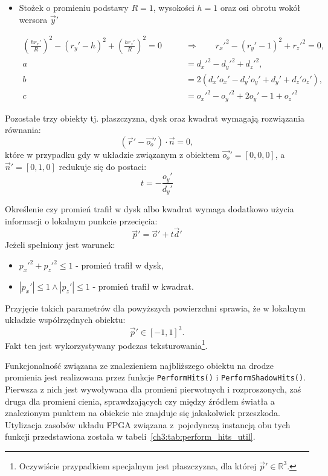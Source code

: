 \begin{enumerate}
\begin{itemize}
\item Stożek o promieniu podstawy $R=1$, wysokości $h = 1$ oraz osi obrotu wokół wersora $\vec{y}'$

\begin{align*}
\left(\frac{hr_x'}{R} \right)^2 - (r_y' - h)^2 + \left(\frac{hr_z'}{R} \right)^2 = 0\qquad &\Rightarrow\qquad r_x'^2 - (r_y' - 1)^2 + r_z'^2 = 0,\\
a &= d_x'^2 - d_y'^2 + d_z'^2,\\
b &= 2\left(d_x'o_x' - d_y'o_y' + d_y' + d_z'o_z'\right),\\
c &= o_x'^2 - o_y'^2 + 2o_y' - 1 + o_z'^2
\end{align*}

\end{itemize}

Pozostałe trzy obiekty tj. płaszczyzna, dysk oraz kwadrat wymagają rozwiązania równania:
\begin{equation*}
(\vec{r}' - \vec{o_o}') \cdot \vec{n} = 0,
\end{equation*}
które w przypadku gdy w układzie związanym z obiektem $\vec{o_o}' = [0,0,0]$, a $\vec{n}' = [0, 1, 0]$ redukuje się do postaci:
\begin{equation*}
t = -\frac{o_y'}{d_y'}
\end{equation*}

Określenie czy promień trafił w dysk albo kwadrat wymaga dodatkowo użycia informacji o lokalnym punkcie przecięcia:
\begin{equation}
\vec{p}' = \vec{o}' + t\vec{d}'
\end{equation}
Jeżeli spełniony jest warunek:
\begin{itemize}
\item $p_x'^2 + p_z'^2 \leq 1$ - promień trafił w dysk,
\item $|p_x'| \leq 1 \wedge |p_z'| \leq 1$ - promień trafił w kwadrat.
\end{itemize}
Przyjęcie takich parametrów dla powyższych powierzchni sprawia, że w lokalnym układzie współrzędnych obiektu:
\begin{equation*}
\vec{p}'\in [-1, 1]^3.
\end{equation*}
Fakt ten jest wykorzystywany podczas teksturowania\footnote{Oczywiście przypadkiem specjalnym jest płaszczyzna, dla której $\vec{p}'\in \mathbb{R}^3$.}.

Funkcjonalność związana ze znalezieniem najbliższego obiektu na drodze promienia jest realizowana przez funkcje \texttt{PerformHits()} i \texttt{PerformShadowHits()}. Pierwsza z nich jest wywoływana dla promieni pierwotnych i rozproszonych, zaś druga dla promieni cienia, sprawdzających czy między źródłem światła a znalezionym punktem na obiekcie nie znajduje się jakakolwiek przeszkoda. Utylizacja zasobów układu FPGA związana z~pojedynczą instancją obu tych funkcji przedstawiona została w tabeli~\ref{ch3:tab:perform_hits_util}.


\end{enumerate}

